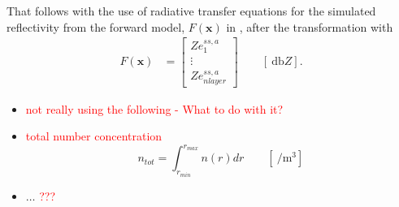That follows with the use of radiative transfer equations for the simulated reflectivity from the forward model, $F(\mathbf{x})$ in , after the transformation with 
\begin{align}
	F(\mathbf{x}) & = \begin{bmatrix} 
		Ze^{ss,a}_1 \\
		\vdots \\
		Ze^{ss,a}_{nlayer}
	\end{bmatrix} \qquad [\SI{}{\decibel Z}]. \label{eq:forward_model}
\end{align}


\begin{itemize}
	\item \textcolor{red}{not really using the following - What to do with it?}
	\item \textcolor{red}{total number concentration} \\
	$$n_{tot} = \int_{r_{min}}^{r_{max}} n(r) dr \qquad [\SI{}{\per\cubic\metre}]$$ 
	\item $\ldots$ \textcolor{red}{??? }
	
\end{itemize}



